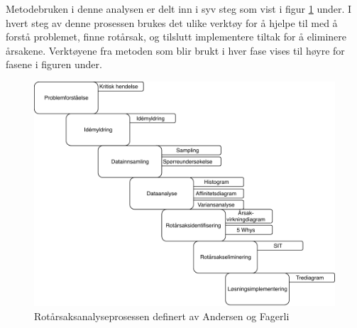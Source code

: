 Metodebruken i denne analysen er delt inn i syv steg som vist i figur \ref{fig:prosess} under. I hvert steg av denne prosessen brukes det ulike verktøy for å hjelpe til med å forstå problemet, finne rotårsak, og tilslutt implementere tiltak for å eliminere årsakene. Verktøyene fra metoden som blir brukt i hver fase vises til høyre for fasene i figuren under. 
\begin{figure}[H]
    \centering
    \includegraphics[scale=0.6]{case_2/bilder/RCA-Prosess-case-2.pdf}
    \caption[Rotårsaksanalyseprosessen]{Rotårsaksanalyseprosessen definert av Andersen og Fagerli}
    \label{fig:prosess}
\end{figure}